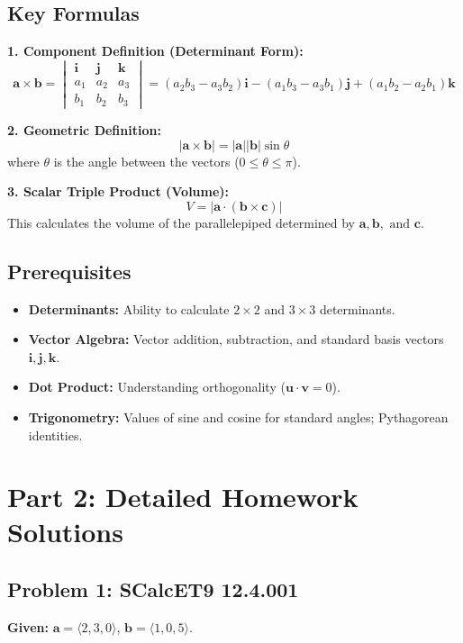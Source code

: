\documentclass[11pt]{article}
\renewcommand{\vec}[1]{\mathbf{#1}}
\newcommand{\ihat}{\mathbf{i}}
\newcommand{\jhat}{\mathbf{j}}
\newcommand{\khat}{\mathbf{k}}
\begin{document}
\subsection{Key Formulas}
\textbf{1. Component Definition (Determinant Form):}
\[
\vec{a} \times \vec{b} = \begin{vmatrix} \ihat & \jhat & \khat \\ a_1 & a_2 & a_3 \\ b_1 & b_2 & b_3 \end{vmatrix} = (a_2 b_3 - a_3 b_2)\ihat - (a_1 b_3 - a_3 b_1)\jhat + (a_1 b_2 - a_2 b_1)\khat
\]

\textbf{2. Geometric Definition:}
\[
|\vec{a} \times \vec{b}| = |\vec{a}| |\vec{b}| \sin \theta
\]
where $\theta$ is the angle between the vectors ($0 \le \theta \le \pi$).

\textbf{3. Scalar Triple Product (Volume):}
\[
V = |\vec{a} \cdot (\vec{b} \times \vec{c})|
\]
This calculates the volume of the parallelepiped determined by $\vec{a}, \vec{b}, \text{ and } \vec{c}$.

\subsection{Prerequisites}
\begin{itemize}
    \item \textbf{Determinants:} Ability to calculate $2 \times 2$ and $3 \times 3$ determinants.
    \item \textbf{Vector Algebra:} Vector addition, subtraction, and standard basis vectors $\ihat, \jhat, \khat$.
    \item \textbf{Dot Product:} Understanding orthogonality ($\vec{u} \cdot \vec{v} = 0$).
    \item \textbf{Trigonometry:} Values of sine and cosine for standard angles; Pythagorean identities.
\end{itemize}

\newpage

\section{Part 2: Detailed Homework Solutions}

\subsection*{Problem 1: SCalcET9 12.4.001}
\textbf{Given:} $\vec{a} = \langle 2, 3, 0 \rangle$, $\vec{b} = \langle 1, 0, 5 \rangle$.
\end{document}
